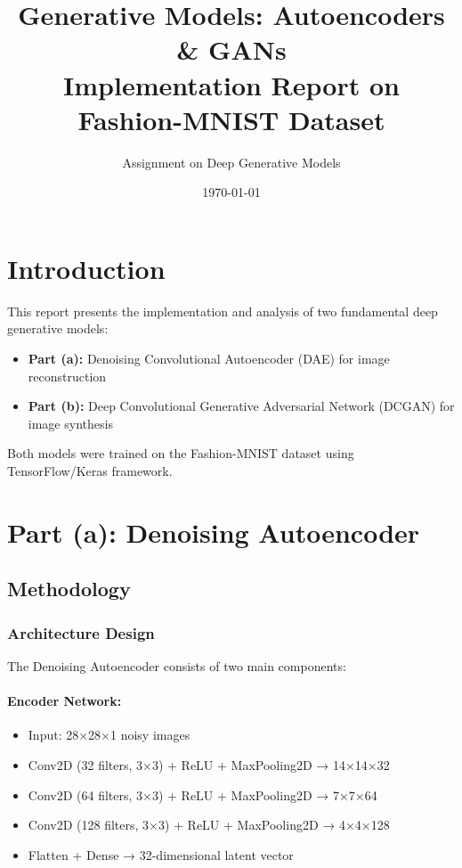 \documentclass[11pt,a4paper]{article}
\title{\textbf{Generative Models: Autoencoders \& GANs}\\ 
\large Implementation Report on Fashion-MNIST Dataset}
\author{Assignment on Deep Generative Models}
\date{\today}
\begin{document}
\maketitle

\section{Introduction}

This report presents the implementation and analysis of two fundamental deep generative models:
\begin{itemize}
    \item \textbf{Part (a):} Denoising Convolutional Autoencoder (DAE) for image reconstruction
    \item \textbf{Part (b):} Deep Convolutional Generative Adversarial Network (DCGAN) for image synthesis
\end{itemize}

Both models were trained on the Fashion-MNIST dataset using TensorFlow/Keras framework.

\section{Part (a): Denoising Autoencoder}

\subsection{Methodology}

\subsubsection{Architecture Design}

The Denoising Autoencoder consists of two main components:

\paragraph{Encoder Network:}
\begin{itemize}
    \item Input: 28×28×1 noisy images
    \item Conv2D (32 filters, 3×3) + ReLU + MaxPooling2D → 14×14×32
    \item Conv2D (64 filters, 3×3) + ReLU + MaxPooling2D → 7×7×64
    \item Conv2D (128 filters, 3×3) + ReLU + MaxPooling2D → 4×4×128
    \item Flatten + Dense → 32-dimensional latent vector
\end{itemize}
\end{document}
